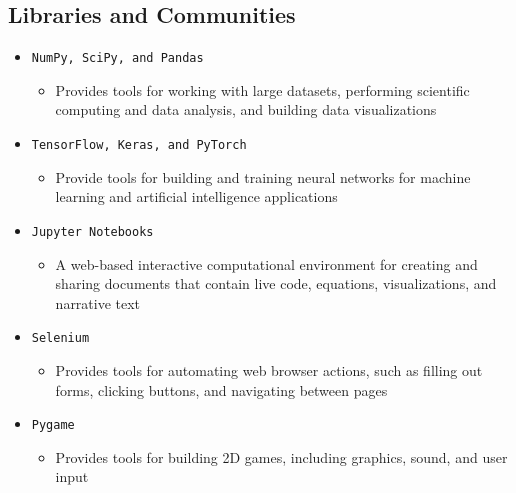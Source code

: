 \subsection{Libraries and Communities}
\begin{itemize}
	\item \texttt{NumPy, SciPy, and Pandas}
	\begin{itemize}
		\item Provides tools for working with large datasets, performing scientific computing and data analysis, and building data visualizations
	\end{itemize}
	
	\item \texttt{TensorFlow, Keras, and PyTorch}
	\begin{itemize}
		\item Provide tools for building and training neural networks for machine learning and artificial intelligence applications
	\end{itemize}
	
	\item \texttt{Jupyter Notebooks}
	\begin{itemize}
		\item A web-based interactive computational environment for creating and sharing documents that contain live code, equations, visualizations, and narrative text
	\end{itemize}
	
	\item \texttt{Selenium}
	\begin{itemize}
		\item Provides tools for automating web browser actions, such as filling out forms, clicking buttons, and navigating between pages
	\end{itemize}

	\item \texttt{Pygame}
	\begin{itemize}
		\item Provides tools for building 2D games, including graphics, sound, and user input
	\end{itemize}
\end{itemize}
